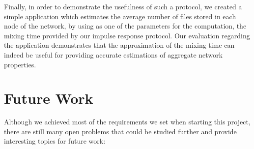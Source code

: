 \documentclass[a4paper,11pt,twoside]{report}
\begin{document}
Finally, in order to demonstrate the usefulness of such a protocol, we created a simple application which estimates the average number of files stored in each node of the network, by using as one of the parameters for the computation, the mixing time provided by our impulse response protocol. Our evaluation regarding the application demonstrates that the approximation of the mixing time can indeed be useful for providing accurate estimations of aggregate network properties.


\section{Future Work}

Although we achieved most of the requirements we set when starting this project, there are still many open problems that could be studied further and provide interesting topics for future work:
\end{document}
